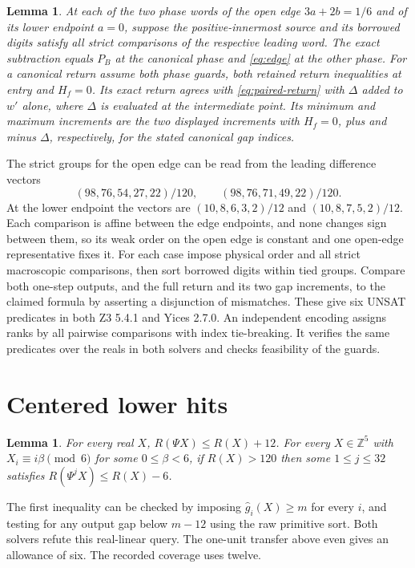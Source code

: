 \documentclass[11pt,reqno]{amsart}
\newtheorem{lemma}[theorem]{Lemma}
\theoremstyle{remark}
\newcommand{\Z}{\mathbb Z}
\begin{document}
\begin{lemma}\label{lem:seam-tests}
At each of the two phase words of the open edge \(3a+2b=1/6\) and of its lower endpoint \(a=0\), suppose the positive-innermost source and its borrowed digits satisfy all strict comparisons of the respective leading word. The exact subtraction equals \(P_B\) at the canonical phase and \eqref{eq:edge} at the other phase. For a canonical return assume both phase guards, both retained return inequalities at entry and \(H_f=0\). Its exact return agrees with \eqref{eq:paired-return} with \(\Delta\) added to \(w'\) alone, where \(\Delta\) is evaluated at the intermediate point. Its minimum and maximum increments are the two displayed increments with \(H_f=0\), plus and minus \(\Delta\), respectively, for the stated canonical gap indices.
\end{lemma}

The strict groups for the open edge can be read from the leading difference vectors
\[
 (98,76,54,27,22)/120,\qquad (98,76,71,49,22)/120.
\]
At the lower endpoint the vectors are \((10,8,6,3,2)/12\) and \((10,8,7,5,2)/12\). Each comparison is affine between the edge endpoints, and none changes sign between them, so its weak order on the open edge is constant and one open-edge representative fixes it. For each case impose physical order and all strict macroscopic comparisons, then sort borrowed digits within tied groups. Compare both one-step outputs, and the full return and its two gap increments, to the claimed formula by asserting a disjunction of mismatches. These give six UNSAT predicates in both Z3 5.4.1 and Yices 2.7.0. An independent encoding assigns ranks by all pairwise comparisons with index tie-breaking. It verifies the same predicates over the reals in both solvers and checks feasibility of the guards.

\section{Centered lower hits}\label{ap:clock}

\begin{lemma}\label{lem:centered}
For every real \(X\), \(R(\Psi X)\le R(X)+12\). For every \(X\in\Z^5\) with \(X_i\equiv i\beta\pmod6\) for some \(0\le\beta<6\), if \(R(X)>120\) then some \(1\le j\le32\) satisfies \(R(\Psi^jX)\le R(X)-6\).
\end{lemma}

The first inequality can be checked by imposing \(\widehat g_i(X)\ge m\) for every \(i\), and testing for any output gap below \(m-12\) using the raw primitive sort. Both solvers refute this real-linear query. The one-unit transfer above even gives an allowance of six. The recorded coverage uses twelve.
\end{document}
